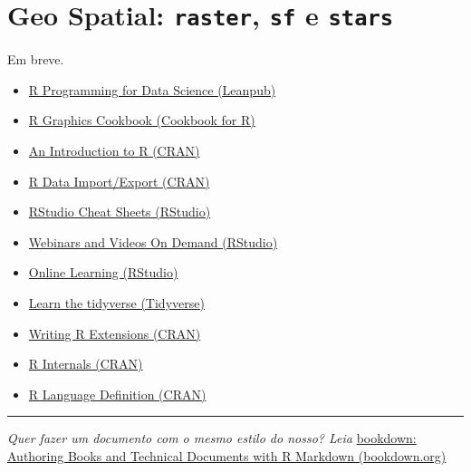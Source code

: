 \documentclass[]{book}
\providecommand{\tightlist}{%
  \setlength{\itemsep}{0pt}\setlength{\parskip}{0pt}}
\theoremstyle{definition}
\theoremstyle{definition}
\theoremstyle{definition}
\theoremstyle{remark}
\begin{document}
\chapter{\texorpdfstring{Geo Spatial: \texttt{raster}, \texttt{sf} e
\texttt{stars}}{Geo Spatial: raster, sf e stars}}\label{geo}

Em breve.

\begin{itemize}
\tightlist
\item
  \href{https://leanpub.com/rprogramming}{R Programming for Data Science
  (Leanpub)}\\
\item
  \href{http://www.cookbook-r.com/Graphs/}{R Graphics Cookbook (Cookbook
  for R)}\\
\item
  \href{https://cran.r-project.org/doc/manuals/r-release/R-intro.html}{An
  Introduction to R (CRAN)}\\
\item
  \href{https://cran.r-project.org/doc/manuals/r-release/R-data.html}{R
  Data Import/Export (CRAN)}\\
\item
  \href{https://www.rstudio.com/resources/cheatsheets/}{RStudio Cheat
  Sheets (RStudio)}\\
\item
  \href{https://www.rstudio.com/resources/webinars/}{Webinars and Videos
  On Demand (RStudio)}\\
\item
  \href{https://www.rstudio.com/online-learning/}{Online Learning
  (RStudio)}\\
\item
  \href{https://www.tidyverse.org/learn/}{Learn the tidyverse
  (Tidyverse)}
\item
  \href{https://cran.r-project.org/doc/manuals/r-release/R-exts.html}{Writing
  R Extensions (CRAN)}\\
\item
  \href{https://cran.r-project.org/doc/manuals/r-release/R-ints.html}{R
  Internals (CRAN)}\\
\item
  \href{https://cran.r-project.org/doc/manuals/r-release/R-lang.html}{R
  Language Definition (CRAN)}
\end{itemize}

\begin{center}\rule{0.5\linewidth}{\linethickness}\end{center}

\emph{Quer fazer um documento com o mesmo estilo do nosso? Leia}
\href{https://bookdown.org/yihui/bookdown/}{bookdown: Authoring Books
and Technical Documents with R Markdown (bookdown.org)}


\end{document}
